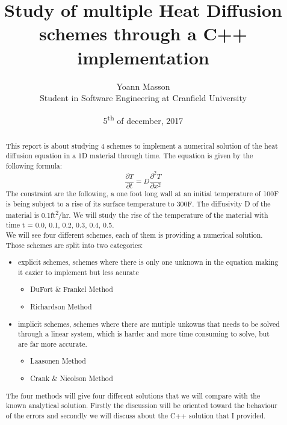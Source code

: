 \documentclass[12pt, a4paper]{report}
\title{Study of multiple Heat Diffusion schemes through a C++ implementation}
\author{Yoann Masson \\ Student in Software Engineering at Cranfield University}
\date{5\textsuperscript{th} of december, 2017}
\begin{document}
\begin{titlepage}
\maketitle
\end{titlepage}


\begin{abstract}
This report is about studying 4 schemes to implement a numerical solution of the heat diffusion equation in a 1D material through time. The equation is given by the following formula: \begin{equation}\frac{\partial T}{\partial t} = D\frac{\partial^2T }{\partial x^2}
\end{equation} 
The constraint are the following, a one foot long wall at an initial temperature of 100\degree F is being subject to a rise of its surface temperature to 300\degree F. The diffusivity D of the material is 0.1ft\textsuperscript{2}/hr. We will study the rise of the temperature of the material with time t = { 0.0, 0.1, 0.2, 0.3, 0.4, 0.5}.
\\
We will see four different schemes, each of them is providing a numerical solution. Those schemes are split into two categories:
\begin{itemize}

\item explicit schemes, schemes where there is only one unknown in the equation making it eazier to implement but less acurate
\begin{itemize}
\item DuFort \& Frankel Method
\item Richardson Method
\end{itemize}
\item implicit schemes, schemes where there are mutiple unkowns that needs to be solved through a linear system, which is harder and more time consuming to solve, but are far more accurate.
\begin{itemize}
\item Laasonen Method
\item Crank \& Nicolson Method
\end{itemize}
\end{itemize}

The four methods will give four different solutions that we will compare with the known analytical solution. Firstly the discussion will be oriented toward the behaviour of the errors and secondly we will discuss about the C++ solution that I provided.
\end{abstract}
\end{document}
